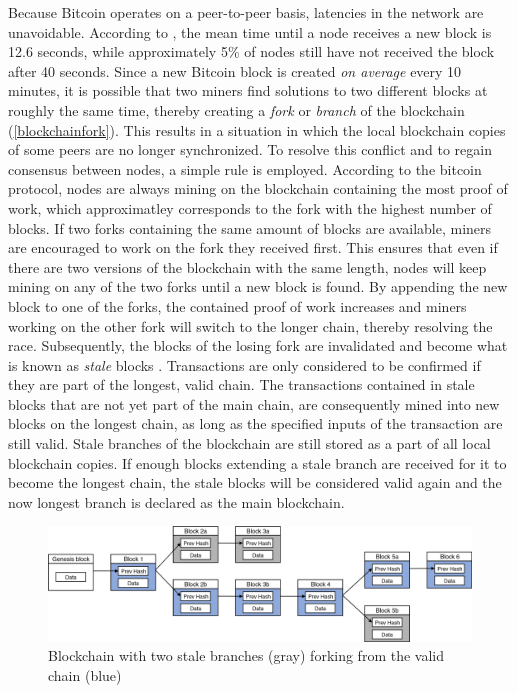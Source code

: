 \documentclass[a4paper,12pt,twoside]{report}
\begin{document}
Because Bitcoin operates on a peer-to-peer basis, latencies in the network are unavoidable. According to \cite{infoprop}, the mean time until a
node receives a new block is 12.6 seconds, while approximately 5\% of nodes still have not received the block after 40 seconds. Since a new Bitcoin block is created \textit{on average} every 10 minutes, it is possible that two miners find solutions to two different blocks at roughly the same time, thereby creating a \textit{fork} or \textit{branch} of the blockchain (\autoref{blockchainfork}). This results in a situation in which the local blockchain copies of some peers are no longer synchronized. To resolve this conflict and to regain consensus between nodes, a simple rule is employed. According to the bitcoin protocol, nodes are always mining on the blockchain containing the most proof of work, which approximatley corresponds to the fork with the highest number of blocks. If two forks containing the same amount of blocks are available, miners are encouraged to work on the fork they received first. This ensures that even if there are two versions of the blockchain with the same length, nodes will keep mining on any of the two forks until a new block is found. By appending the new block to one of the forks, the contained proof of work increases and miners working on the other fork will switch to the longer chain, thereby resolving the race. Subsequently, the blocks of the losing fork are invalidated and become what is known as \textit{stale} blocks \cite{okupski2014bitcoin}. Transactions are only considered to be confirmed if they are part of the longest, valid chain. The transactions contained in stale blocks that are not yet part of the main chain, are consequently mined into new blocks on the longest chain, as long as the specified inputs of the transaction are still valid. Stale branches of the blockchain are still stored as a part of all local blockchain copies. If enough blocks extending a stale branch are received for it to become the longest chain, the stale blocks will be considered valid again and the now longest branch is declared as the main blockchain.
\begin{figure}[ht]
	\centering
  \includegraphics[width=\textwidth]{BlockchainFork.png}
	\caption{Blockchain with two stale branches (gray) forking from the valid chain (blue) }
	\label{blockchainfork}
\end{figure}
\end{document}
